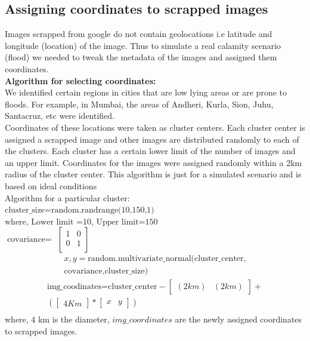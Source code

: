 \documentclass{IEEEtran}
\begin{document}
\subsection{Assigning coordinates to scrapped images}
Images scrapped from google do not contain geolocations i.e latitude and longitude (location) of the image. Thus to simulate a real calamity scenario (flood) we needed to tweak the metadata of the images and assigned them coordinates.
\\\textbf{Algorithm for selecting coordinates:}\\
We identified certain regions in cities that are low lying areas or are prone to floods. For example, in Mumbai, the areas of Andheri, Kurla, Sion, Juhu, Santacruz, etc were identified.\\
Coordinates of these locations were taken as cluster centers.
Each cluster center is assigned a scrapped image and other images are distributed randomly to each of the clusters. Each cluster has a certain lower limit of the number of images and an upper limit. 
Coordinates for the images were assigned randomly within a 2km radius of the cluster center. This algorithm is just for a simulated scenario and is based on ideal conditions\\
Algorithm for a particular cluster:\\
$\text{cluster\_size=random.randrange(10,150,1)}$ \\
$\text{where, Lower limit =10, Upper limit=150}$\\
$\text{covariance} = $
$\begin{bmatrix}
1 & 0\\
0 & 1\\ 
\end{bmatrix}$
\begin{equation}
\begin{aligned}
x,y = \text{random.multivariate\_normal(cluster\_center,}\\
      \text{covariance,cluster\_size)}
\end{aligned}
\end{equation}
\begin{equation}
\begin{split}
\text{img\_coodinates=cluster\_center} -
\begin{bmatrix}
(2km) & (2km)
\end{bmatrix} +  \\ (
\begin{bmatrix}
4Km 
\end{bmatrix} *
\begin{bmatrix}
x & y 
\end{bmatrix}  )\\
\end{split}
\end{equation}
where, 4 km is the diameter, 
$img\_coordinates$ are the newly assigned coordinates to scrapped images.
\end{document}

